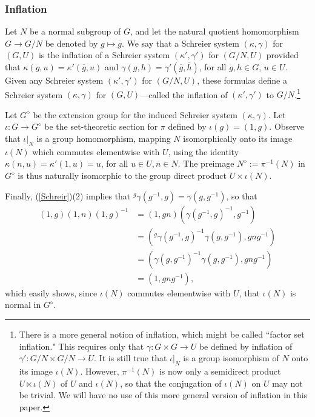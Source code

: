 \documentclass[11pt,leqno,amscd,amssymb,verbatim, url]{amsart}
\theoremstyle{definition}
\numberwithin{equation}{thm}
\begin{document}
\subsubsection{Inflation} Let $N$ be a normal subgroup of $G$, and let the natural quotient homomorphism $G\to G/N$ be denoted by
$g\mapsto\overline g$. We say that a Schreier system $(\kappa,\gamma)$ for $(G,U)$ is the
inflation of a Schreier system $(\kappa',\gamma')$ for $(G/N,U)$ provided that $\kappa(g,u)=\kappa'(\overline g,u)$
and $\gamma(g,h)=\gamma'(\overline g,\overline h)$, for all $g,h\in G$, $u\in U$. Given any Schreier system
$(\kappa',\gamma')$ for  $(G/N,U)$, these formulas define a Schreier system $(\kappa,\gamma)$ for $(G,U)$---called the
inflation of $(\kappa',\gamma')$ to $G/N$.\footnote{There is a more general notion of inflation, which might be called ``factor set inflation." This requires only that
$\gamma:G\times G\to U$ be defined by inflation of $\gamma':G/N\times G/N\to U$. It is still true that $\iota|_N$ is a group
 isomorphism of $N$ onto its image $\iota(N)$. However,  $\pi^{-1}(N)$ is now only
 a semidirect product $U\ltimes \iota(N)$ of $U$ and $\iota(N)$, so that the conjugation of $\iota(N)$ on $U$ may not
 be trivial. We will have no use of this more general version of inflation in this paper.}
 
  Let $G^\diamond$ be the extension group for the induced Schreier system $(\kappa,\gamma)$.
Let $\iota:G\to G^\diamond$ be the set-theoretic section for $\pi$ defined by $\iota(g)=(1,g)$. Observe that
$\iota|_N$ is a group homomorphism, mapping $N$ isomorphically onto its image $\iota(N)$ which commutes elementwise with $U$, using the identity $\kappa(n,u)=\kappa'(1,u)=u$, for all $u\in U,n\in N$.  The preimage $N^\diamond:=\pi^{-1}(N)$ in $G^\diamond$ is thus naturally isomorphic to 
the group direct product $U\times \iota(N)$.
 
 Finally, (\ref{Schreir})(2) implies that $^g\gamma(g^{-1},g)=\gamma(g,g^{-1})$, so that
 $$\begin{aligned} (1,g)(1,n)(1,g)^{-1} & = (1,gn)(\gamma(g^{-1},g)^{-1},g^{-1})\\
 & = ({^g\gamma}(g^{-1},g)^{-1}\gamma(g,g^{-1}),gng^{-1})\\&= (\gamma(g,g^{-1})^{-1}\gamma(g,g^{-1}),gng^{-1})\\
 &=(1,gng^{-1}),
 \end{aligned}
$$
which easily shows, since $\iota(N)$ commutes elementwise with $U$,  that $\iota(N)$ is normal in $G^\diamond$.
\end{document}
